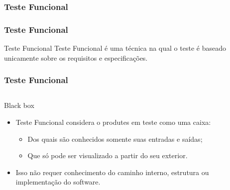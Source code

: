 \begin{frame}[c,parent={cmap:software-testing}, hasprev=false, hasnext=false]
\frametitle{Teste Funcional}
\label{cmap:functional-testing}

\end{frame}



\begin{frame}[parent={cmap:functional-testing}, hasprev=false, hasnext=true]
\frametitle{Teste Funcional}
\label{concept:functional-testing}

\begin{block:concept}{Teste Funcional}
Teste Funcional é uma técnica na qual o teste é baseado unicamente sobre os
requisitos e especificações.
\end{block:concept}

\end{frame}


\begin{frame}[hasprev=true, hasnext=true]
\frametitle{Teste Funcional}
\label{concept:black-box}

\begin{columns}[t]
\begin{block:fact}{Black box}
\begin{itemize}
	\item Teste Funcional considera o produtes em teste como uma caixa:
	\begin{itemize}
		\item Dos quais são conhecidos somente suas entradas e saídas;

		\item Que só pode ser visualizado a partir do seu exterior.
	\end{itemize}

	\item Isso não requer conhecimento do caminho interno, estrutura ou 
	implementação do software.
\end{itemize}
\end{block:fact}

\end{columns}
\end{frame}



